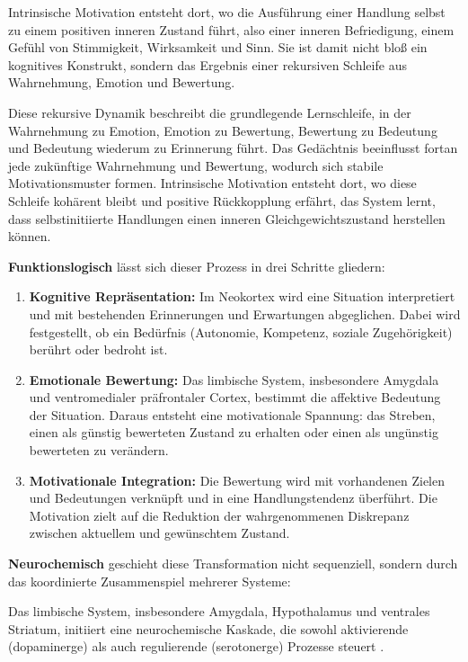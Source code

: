 Intrinsische Motivation entsteht dort, wo die Ausführung einer Handlung selbst zu einem positiven inneren Zustand führt, also einer inneren Befriedigung, einem Gefühl von Stimmigkeit, Wirksamkeit und Sinn. Sie ist damit nicht bloß ein kognitives Konstrukt, sondern das Ergebnis einer rekursiven Schleife aus Wahrnehmung, Emotion und Bewertung.

Diese rekursive Dynamik beschreibt die grundlegende Lernschleife, in der Wahrnehmung zu Emotion, Emotion zu Bewertung, Bewertung zu Bedeutung und Bedeutung wiederum zu Erinnerung führt. Das Gedächtnis beeinflusst fortan jede zukünftige Wahrnehmung und Bewertung, wodurch sich stabile Motivationsmuster formen. Intrinsische Motivation entsteht dort, wo diese Schleife kohärent bleibt und positive Rückkopplung erfährt, das System lernt, dass selbstinitiierte Handlungen einen inneren Gleichgewichtszustand herstellen können.

\textbf{Funktionslogisch} lässt sich dieser Prozess in drei Schritte gliedern:

\begin{enumerate}
\item \textbf{Kognitive Repräsentation:} Im Neokortex wird eine Situation interpretiert und mit bestehenden Erinnerungen und Erwartungen abgeglichen. Dabei wird festgestellt, ob ein Bedürfnis (Autonomie, Kompetenz, soziale Zugehörigkeit) berührt oder bedroht ist.
\item \textbf{Emotionale Bewertung:} Das limbische System, insbesondere Amygdala und ventromedialer präfrontaler Cortex, bestimmt die affektive Bedeutung der Situation. Daraus entsteht eine motivationale Spannung: das Streben, einen als günstig bewerteten Zustand zu erhalten oder einen als ungünstig bewerteten zu verändern.
\item \textbf{Motivationale Integration:} Die Bewertung wird mit vorhandenen Zielen und Bedeutungen verknüpft und in eine Handlungstendenz überführt. Die Motivation zielt auf die Reduktion der wahrgenommenen Diskrepanz zwischen aktuellem und gewünschtem Zustand.
\end{enumerate}

\textbf{Neurochemisch} geschieht diese Transformation nicht sequenziell, sondern durch das koordinierte Zusammenspiel mehrerer Systeme:

Das limbische System, insbesondere Amygdala, Hypothalamus und ventrales Striatum, initiiert eine neurochemische Kaskade, die sowohl aktivierende (dopaminerge) als auch regulierende (serotonerge) Prozesse steuert \cite{LeDoux1996, Panksepp1998, Damasio1999}.

